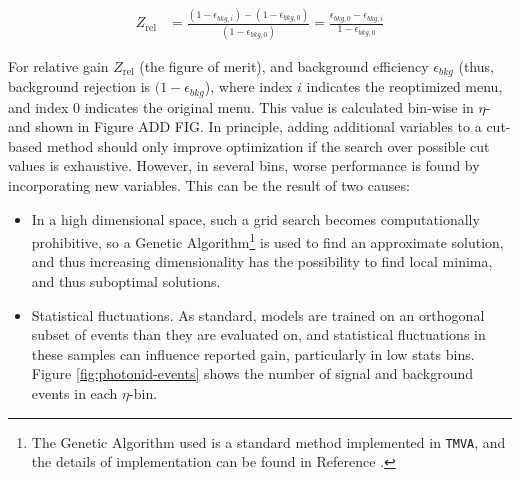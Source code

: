 \begin{align}
    Z_{\text{rel}} &= \frac{(1-\epsilon_{bkg,i}) - (1-\epsilon_{bkg,0})}{(1-\epsilon_{bkg,0})} = \frac{\epsilon_{bkg,0} - \epsilon_{bkg,i}}{1-\epsilon_{bkg,0}}
    \label{eqn:improvement-metric}
\end{align}

For relative gain $Z_{\text{rel}}$ (the figure of merit),  and background efficiency $\epsilon_{bkg}$ (thus, background rejection is $(1-\epsilon_{bkg}$), where index $i$ indicates the reoptimized menu, and index $0$ indicates the original menu. This value is calculated bin-wise in $\eta$-\pt and shown in Figure ADD FIG. In principle, adding additional variables to a cut-based method should only improve optimization if the search over possible cut values is exhaustive. However, in several bins, worse performance is found by incorporating new variables. This can be the result of two causes:
\begin{itemize}
    \item In a high dimensional space, such a grid search becomes computationally prohibitive, so a Genetic Algorithm\footnote{The Genetic Algorithm used is a standard method implemented in \texttt{TMVA}, and the details of implementation can be found in Reference \cite{TMVA}.} \cite{genetic-algo} is used to find an approximate solution, and thus increasing dimensionality has the possibility to find local minima, and thus suboptimal solutions.
    \item Statistical fluctuations. As standard, models are trained on an orthogonal subset of events than they are evaluated on, and statistical fluctuations in these samples can influence reported gain, particularly in low stats bins. Figure \ref{fig:photonid-events} shows the number of signal and background events in each $\eta$-\pt bin.
\end{itemize}

